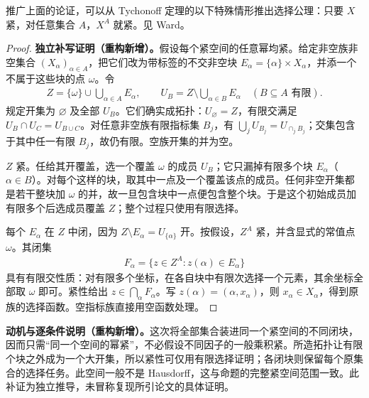 \documentclass[../../main.tex]{subfiles}
\begin{document}
\begin{proposition}\label{proposition:ch04-compact-powers-imply-choice}
推广上面的论证，可以从 Tychonoff 定理的以下特殊情形推出选择公理：只要 $X$ 紧，对任意集合 $A$，$X^A$ 就紧。见 Ward\cite{folland-bib-156}。
\end{proposition}
\begin{proof}
\textbf{独立补写证明（重构新增）。}假设每个紧空间的任意幂均紧。给定非空族非空集合 $(X_\alpha)_{\alpha\in A}$，把它们改为带标签的不交非空块 $E_\alpha=\{\alpha\}\times X_\alpha$，并添一个不属于这些块的点 $\omega$。令
\begin{align*}
Z=\{\omega\}\cup\bigcup_{\alpha\in A}E_\alpha,
\qquad
U_B=Z\setminus\bigcup_{\alpha\in B}E_\alpha
\quad(B\subseteq A\text{ 有限}).
\end{align*}
规定开集为 $\varnothing$ 及全部 $U_B$。它们确实成拓扑：$U_\varnothing=Z$，有限交满足 $U_B\cap U_C=U_{B\cup C}$。对任意非空族有限指标集 $B_j$，有 $\bigcup_jU_{B_j}=U_{\cap_jB_j}$；交集包含于其中任一有限 $B_j$，故仍有限。空族开集的并为空。

$Z$ 紧。任给其开覆盖，选一个覆盖 $\omega$ 的成员 $U_B$；它只漏掉有限多个块 $E_\alpha$（$\alpha\in B$）。对每个这样的块，取其中一点及一个覆盖该点的成员。任何非空开集都是若干整块加 $\omega$ 的并，故一旦包含块中一点便包含整个块。于是这个初始成员加有限多个后选成员覆盖 $Z$；整个过程只使用有限选择。

每个 $E_\alpha$ 在 $Z$ 中闭，因为 $Z\setminus E_\alpha=U_{\{\alpha\}}$ 开。按假设，$Z^A$ 紧，并含显式的常值点 $\omega$。其闭集
\begin{align*}
F_\alpha=\{z\in Z^A:z(\alpha)\in E_\alpha\}
\end{align*}
具有有限交性质：对有限多个坐标，在各自块中有限次选择一个元素，其余坐标全部取 $\omega$ 即可。紧性给出 $z\in\bigcap_\alpha F_\alpha$。写 $z(\alpha)=(\alpha,x_\alpha)$，则 $x_\alpha\in X_\alpha$，得到原族的选择函数。空指标族直接用空函数处理。
\end{proof}
\begin{remark}
\textbf{动机与逐条件说明（重构新增）。}这次将全部集合装进同一个紧空间的不同闭块，因而只需“同一个空间的幂紧”，不必假设不同因子的一般乘积紧。所造拓扑让有限个块之外成为一个大开集，所以紧性可仅用有限选择证明；各闭块则保留每个原集合的选择任务。此空间一般不是 Hausdorff，这与命题的完整紧空间范围一致。此补证为独立推导，未冒称复现所引论文的具体证明。
\end{remark}
\end{document}
